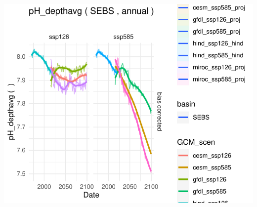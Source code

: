 \documentclass[
]{article}
\begin{document}
\begin{center}\includegraphics{ACLIM2_quickStart_files/figure-latex/ts-1} \end{center}
\end{document}
